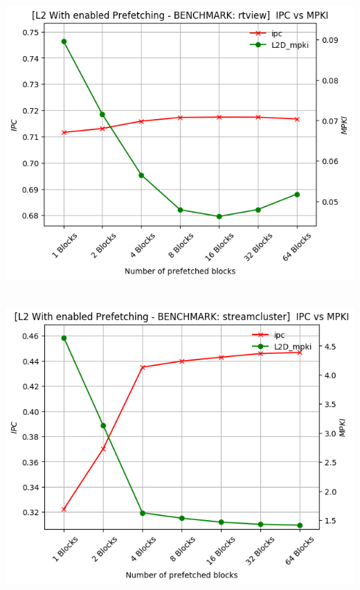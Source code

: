 \begin{minipage}{\textwidth}
    \begin{center}
        \\
        \vspace{3mm}
        \includegraphics[scale=0.70]{graphs/PREF/rtview.png}
        \vspace{6mm}
    \end{center}
\end{minipage}

\begin{minipage}{\textwidth}
    \begin{center}
        \\
        \vspace{3mm}
        \includegraphics[scale=0.70]{graphs/PREF/streamcluster.png}
        \vspace{6mm}
    \end{center}
\end{minipage}


